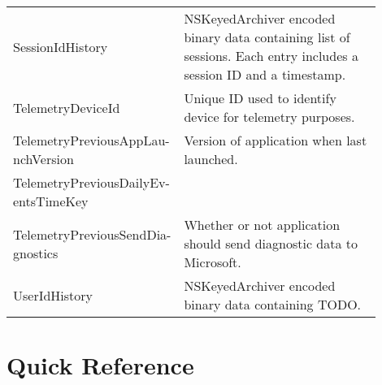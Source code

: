 \documentclass[journal]{IEEEtran}
\begin{document}
\begin{table}[h!]
\begin{tabular}{p{0.35\linewidth} | p{0.55\linewidth}}
\\
SessionIdHistory                                   & NSKeyedArchiver encoded binary data containing list of sessions. Each entry includes a session ID and a timestamp.                                                                                                                                                                               
\\
TelemetryDeviceId                                  & Unique ID used to identify device for telemetry purposes.                                                                                                                                                                                                                                         \\
TelemetryPreviousAppLau- nchVersion                & Version of application when last launched.                                                                                                                                                                                                                                                        
\\
TelemetryPreviousDailyEv- entsTimeKey              &                                                                                                                                                                                                                                                                                                   \\
TelemetryPreviousSendDia- gnostics                 & Whether or not application should send diagnostic data to Microsoft.                                                                                                                                                                                                                              \\
UserIdHistory                                      & NSKeyedArchiver encoded binary data containing TODO.                                                                                                                                                                                                                                              
\end{tabular}
\end{table}

\section{Quick Reference}
\end{document}
